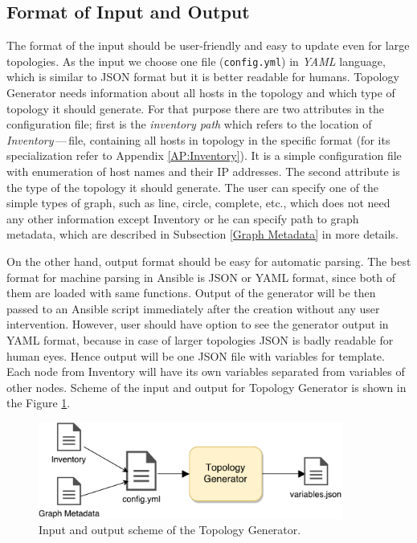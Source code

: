 \subsection{Format of Input and Output}
The format of the input  should be user-friendly and easy to update even for large topologies. As the input we choose one file (\texttt{config.yml}) in \emph{YAML}\footnotemark{}  language, which is similar to JSON format but it is better readable for humans. Topology Generator needs information about all hosts in the topology and which type of topology it should generate. For that purpose there are two attributes in the configuration file; first is the \emph{inventory path} which refers to the location of \emph{Inventory}\,---\,file, containing all hosts in topology in the specific format (for its specialization refer to Appendix \ref{AP:Inventory}). It is a simple configuration file with enumeration of host names and their IP addresses. The second attribute is the type of the topology it should generate. The user can specify one of the simple types of graph, such as line, circle, complete, etc., which does not need any other information except Inventory or he can specify path to graph metadata, which are described in Subsection \ref{Graph Metadata} in more details.

On the other hand, output format should be easy for automatic parsing. The best format for machine parsing in Ansible is JSON or YAML format, since both of them are loaded with same functions. Output of the generator will be then passed to an Ansible script immediately after the creation without any user intervention. However, user should have option to see the generator output in YAML format, because in case of larger topologies JSON is badly readable for human eyes. Hence output will be one JSON file with variables for template. Each node from Inventory will have its own variables separated from variables of other nodes. Scheme of the input and output for Topology Generator is shown in the Figure \ref{fig:generator}.

\begin{figure}[H]
  \centering
  \includegraphics[width=10cm]{obrazky-figures/generator.pdf}
  \caption{Input and output scheme of the Topology Generator.}
  \label{fig:generator}
\end{figure}

